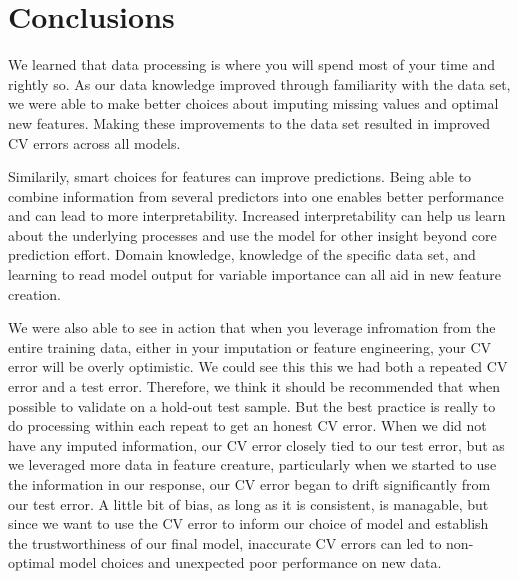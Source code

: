 \documentclass[12pt]{article}
\begin{document}


\section{Conclusions}

We learned that data processing is where you will spend most of your time and rightly so.  As our data knowledge improved through familiarity with the data set, we were able to make better choices about imputing missing values and optimal new features.  Making these improvements to the data set resulted in improved CV errors across all models.

Similarily, smart choices for features can improve predictions.  Being able to combine information from several predictors into one enables better performance and can lead to more interpretability.  Increased interpretability can help us learn about the underlying processes and use the model for other insight beyond core prediction effort.  Domain knowledge, knowledge of the specific data set, and learning to read model output for variable importance can all aid in new feature creation.


We were also able to see in action that when you leverage infromation from the entire training data, either in your imputation or feature engineering, your CV error will be overly optimistic.  We could see this this we had both a repeated CV error and a test error.  Therefore, we think it should be recommended that when possible to validate on a hold-out test sample.  But the best practice is really to do processing within each repeat to get an honest CV error.  When we did not have any imputed information, our CV error closely tied to our test error, but as we leveraged more data in feature creature, particularly when we started to use the information in our response, our CV error began to drift significantly from our test error.  A little bit of bias, as long as it is consistent, is managable, but since we want to use the CV error to inform our choice of model and establish the trustworthiness of our final model, inaccurate CV errors can led to non-optimal model choices and unexpected poor performance on new data.
\end{document}
